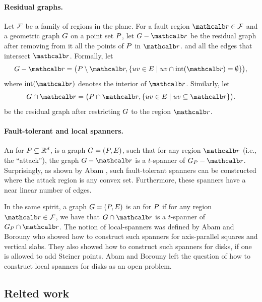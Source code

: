 \documentclass[12pt]{article}%
\begin{document}
\paragraph{Residual graphs.}

Let $\mathcal{F}$ be a family of regions in the plane. For a fault region
$\region \in \FF$ and a geometric graph $G$ on a point set $P$, let
$\G \gminus \region$ be the residual graph after removing from it all
the points of $P$ in $\region$. and all the edges that intersect
$\region$.  Formally, let
\begin{equation*}
    \G \gminus \region%
    =%
    \bigl( \PS \setminus \region, \Set{ uv \in \EG }{ uv \cap
       \interiorX{\region} = \emptyset} \bigr),
\end{equation*}
where $\interiorX{\region}$ denotes the interior of
$\region$. Similarly, let
\begin{equation*}
    \restrictY{\G}{\region}%
    =%
    \bigl( \PS \cap {\region},
    \Set{uv \in \EG}{ uv \subseteq {\region} } \bigr).
\end{equation*}
be the residual graph after restricting $G$ to the region $\region$.

\paragraph{Fault-tolerant and local spanners.}

An  for $P\subseteq \mathbb{R}^d$, is
a graph $G=(P, E)$, such that for any region $\region$ (i.e., the
``attack''), the graph $\G \gminus \region$ is a $t$-spanner of
$\G_\PS - \region$. Surprisingly, as shown by Abam \etal
\cite{abfg-rftgs-09}, such fault-tolerant spanners can be constructed
where the attack region is any convex set. Furthermore, these spanners
have a near linear number of edges.

In the same spirit, a graph $G=(P, E)$ is an  for $P$ if for any region $\region \in \FF$, we have
that $\restrictY{\G}{\region}$ is a $t$-spanner of
$\G_\PS \cap \region$.  The notion of local-spanners was defined by
Abam and Borouny \cite{ab-lgs-21} who showed how to construct such
spanners for axis-parallel squares and vertical slabs. They also
showed how to construct such spanners for disks, if one is allowed to
add Steiner points. Abam and Borouny left the question of how to
construct local spanners for disks as an open problem.

\subsection*{Relted work}
\end{document}
